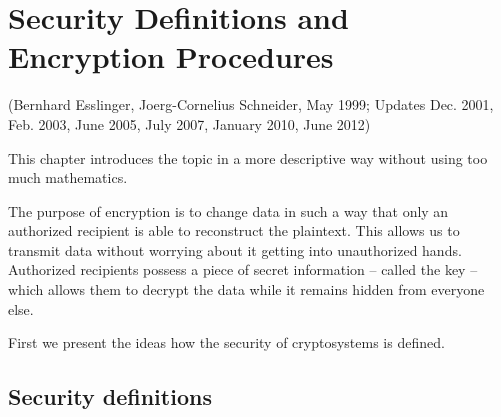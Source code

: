 %
%

\makeatletter \renewcommand{\thepage}{~\csname @arabic\endcsname \c@page~} \makeatother
\hypertarget{Kapitel_1}{}
\chapter{Security Definitions and Encryption Procedures}
\label{Label_Kapitel_1}
(Bernhard Esslinger, Joerg-Cornelius Schneider, May 1999; Updates Dec. 2001, Feb. 2003,
June 2005, July 2007, January 2010, June 2012)

\begin{center}
\end{center}

This chapter introduces the topic in a more descriptive way without using too much mathematics.

The purpose of encryption  is to change data in such a way
that only an authorized recipient is able to reconstruct the plaintext. This
allows us to transmit data without worrying about it getting into unauthorized
hands. Authorized recipients possess a piece of secret information -- called the
key -- which allows them to decrypt the data while it remains hidden from
everyone else.%

First we present the ideas how the security of cryptosystems is defined.



\hypertarget{cm_Section_Security_Definitions}{}
\section[Security definitions]{Security definitions}
\label{cm_Section_Security_Definitions}

